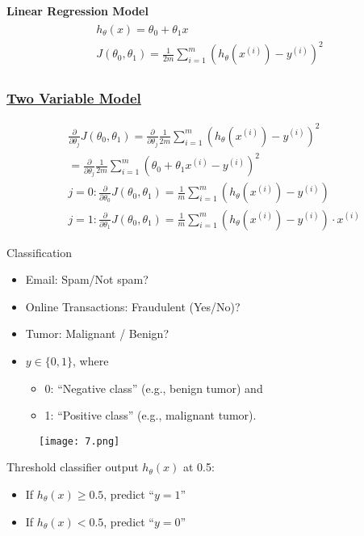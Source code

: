 \documentclass[12pt,a4paper,fleqn]{article}
\begin{document}
 \textbf{Linear Regression Model}
 \begin{align*}
 \begin{gathered}
 h_\theta(x)=\theta_0+\theta_1 x \\
 J\left(\theta_0, \theta_1\right)=\frac{1}{2 m} \sum_{i=1}^m{\left(h_\theta\left(x^{(i)}\right)-y^{(i)}\right)}^2
 \end{gathered}
 \end{align*}

 \subsubsection{\underline{Two Variable Model}} 
 \begin{align*}
    &\frac{\partial}{\partial \theta_j} J\left(\theta_0, \theta_1\right) =\frac{\partial}{\partial \theta_j} \frac{1}{2 m} \sum_{i=1}^m{\left(h_\theta\left(x^{(i)}\right)-y^{(i)}\right)}^2 \\ 
    & =\frac{\partial}{\partial \theta_j} \frac{1}{2 m} \sum_{i=1}^m{\left(\theta_0+\theta_1 x^{(i)}-y^{(i)}\right)}^2 \\
    &j=0: \frac{\partial}{\partial \theta_0} J\left(\theta_0, \theta_1\right)=\frac{1}{m} \sum_{i=1}^m\left(h_\theta\left(x^{(i)}\right)-y^{(i)}\right) \\ 
    &j=1: \frac{\partial}{\partial \theta_1} J\left(\theta_0, \theta_1\right)=\frac{1}{m} \sum_{i=1}^m\left(h_\theta\left(x^{(i)}\right)-y^{(i)}\right) \cdot x^{(i)}
 \end{align*}

 Classification
 \begin{itemize}
    \item Email: Spam/Not spam?
    \item Online Transactions: Fraudulent (Yes/No)?
    \item Tumor: Malignant / Benign?
    \item \(y \in \{0,1\} \), where
    \begin{itemize}
        \item 0: ``Negative class'' (e.g., benign tumor) and 
        \item 1: ``Positive class'' (e.g., malignant tumor).
    \end{itemize}
 \end{itemize}
 \begin{figure}[H]
     \centering
     \texttt{[image: 7.png]}
 \end{figure}

 Threshold classifier output \(h_\theta(x)\) at 0.5:
\begin{itemize}
    \item  If \(h_\theta(x) \geq 0.5\), predict ``\(y=1\)''
    \item If \(h_\theta(x)<0.5\), predict  ``\(y=0\)''
\end{itemize}
\end{document}
